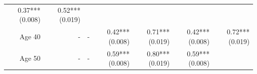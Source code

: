 \documentclass[]{article}
\begin{document}
\begin{longtable}[c]{@{}rrrrrrr@{}}
\begin{minipage}[t]{0.11\columnwidth}\raggedleft\strut
0.37*** (0.008)
\strut\end{minipage} &
\begin{minipage}[t]{0.11\columnwidth}\raggedleft\strut
0.52*** (0.019)
\strut\end{minipage}\tabularnewline
\begin{minipage}[t]{0.12\columnwidth}\raggedleft\strut
Age 40
\strut\end{minipage} &
\begin{minipage}[t]{0.11\columnwidth}\raggedleft\strut
-
\strut\end{minipage} &
\begin{minipage}[t]{0.12\columnwidth}\raggedleft\strut
-
\strut\end{minipage} &
\begin{minipage}[t]{0.11\columnwidth}\raggedleft\strut
0.42*** (0.008)
\strut\end{minipage} &
\begin{minipage}[t]{0.12\columnwidth}\raggedleft\strut
0.71*** (0.019)
\strut\end{minipage} &
\begin{minipage}[t]{0.11\columnwidth}\raggedleft\strut
0.42*** (0.008)
\strut\end{minipage} &
\begin{minipage}[t]{0.11\columnwidth}\raggedleft\strut
0.72*** (0.019)
\strut\end{minipage}\tabularnewline
\begin{minipage}[t]{0.12\columnwidth}\raggedleft\strut
Age 50
\strut\end{minipage} &
\begin{minipage}[t]{0.11\columnwidth}\raggedleft\strut
-
\strut\end{minipage} &
\begin{minipage}[t]{0.12\columnwidth}\raggedleft\strut
-
\strut\end{minipage} &
\begin{minipage}[t]{0.11\columnwidth}\raggedleft\strut
0.59*** (0.008)
\strut\end{minipage} &
\begin{minipage}[t]{0.12\columnwidth}\raggedleft\strut
0.80*** (0.019)
\strut\end{minipage} &
\begin{minipage}[t]{0.11\columnwidth}\raggedleft\strut
0.59*** (0.008)
\strut\end{minipage} &
\begin{minipage}[t]{0.11\columnwidth}\raggedleft\strut

\end{minipage}
\end{longtable}
\end{document}
